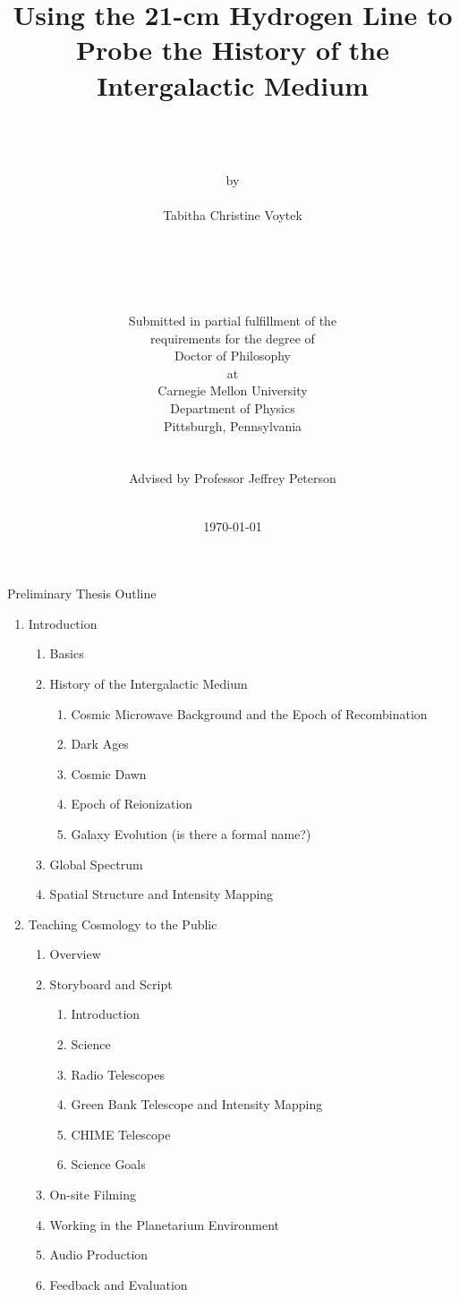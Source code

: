 \documentclass[12pt,twoside]{report}
\author{\\
	\\
	\\
	by \\
	\\
      	Tabitha Christine Voytek \\
	\\
	\\
	\\
	\\
	\\
        Submitted in partial fulfillment of the \\
        requirements for the degree of \\
        Doctor of Philosophy \\
        at \\
        Carnegie Mellon University \\
        Department of Physics \\
        Pittsburgh, Pennsylvania \\
	\\
        \\
	Advised by Professor Jeffrey Peterson
	\\
	\\
}
\title{\bf{
Using the 21-cm Hydrogen Line to Probe the History of the Intergalactic Medium 
}}
\date{\today}
\begin{document}
Preliminary Thesis Outline

\begin{enumerate}
\item Introduction

\begin{enumerate}

\item \cm Basics
\item History of the Intergalactic Medium

\begin{enumerate}
\item Cosmic Microwave Background and the Epoch of Recombination
\item Dark Ages
\item Cosmic Dawn
\item Epoch of Reionization
\item Galaxy Evolution (is there a formal name?)
\end{enumerate}

\item Global \cm Spectrum
\item \cm Spatial Structure and Intensity Mapping

\end{enumerate}

\item Teaching \cm Cosmology to the Public

\begin{enumerate}
\item Overview
\item Storyboard and Script

\begin{enumerate}
\item Introduction
\item \cm Science
\item Radio Telescopes
\item Green Bank Telescope and Intensity Mapping
\item CHIME Telescope
\item Science Goals
\end{enumerate}

\item On-site Filming
\item Working in the Planetarium Environment
\item Audio Production
\item Feedback and Evaluation

\end{enumerate}


\end{enumerate}
\end{document}
